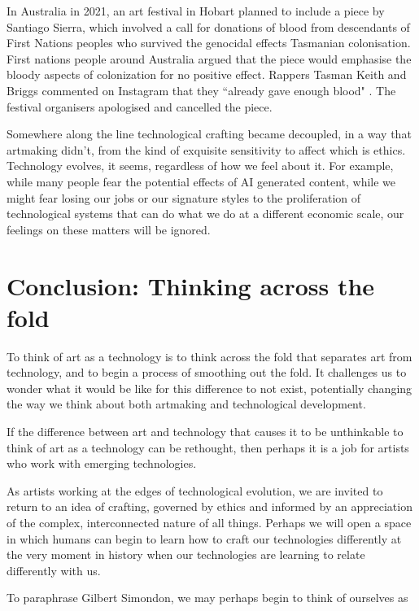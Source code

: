 \documentclass[letter:wpaper]{article}
\begin{document}
    In Australia in 2021, an art festival in Hobart planned to include a piece by Santiago Sierra, which involved a call for donations of blood from descendants of First Nations peoples who survived the genocidal effects Tasmanian colonisation. First nations people around Australia argued that the piece would emphasise the bloody aspects of colonization for no positive effect. Rappers Tasman Keith and Briggs commented on Instagram that they ``already gave enough blood" \citep{DrkMfBld2021}. The festival organisers apologised and cancelled the piece.
    
    Somewhere along the line technological crafting became decoupled, in a way that artmaking didn't, from the kind of exquisite sensitivity to affect which is ethics. Technology evolves, it seems, regardless of how we feel about it. For example, while many people fear the potential effects of AI generated content, while we might fear losing our jobs or our signature styles to the proliferation of technological systems that can do what we do at a different economic scale, our feelings on these matters will be ignored.
    
\section{Conclusion: Thinking across the fold}

    To think of art as a technology is to think across the fold that separates art from technology, and to begin a process of smoothing out the fold. It challenges us to wonder what it would be like for this difference to not exist, potentially changing the way we think about both artmaking and technological development.
    
    If the difference between art and technology that causes it to be unthinkable to think of art as a technology can be rethought, then perhaps it is a job for artists who work with emerging technologies. 
    
    As artists working at the edges of technological evolution, we are invited to return to an idea of crafting, governed by ethics and informed by an appreciation of the complex, interconnected nature of all things. Perhaps we will open a space in which humans can begin to learn how to craft our technologies differently at the very moment in history when our technologies are learning to relate differently with us.
    
    To paraphrase Gilbert Simondon, we may perhaps begin to think of ourselves as
\end{document}
